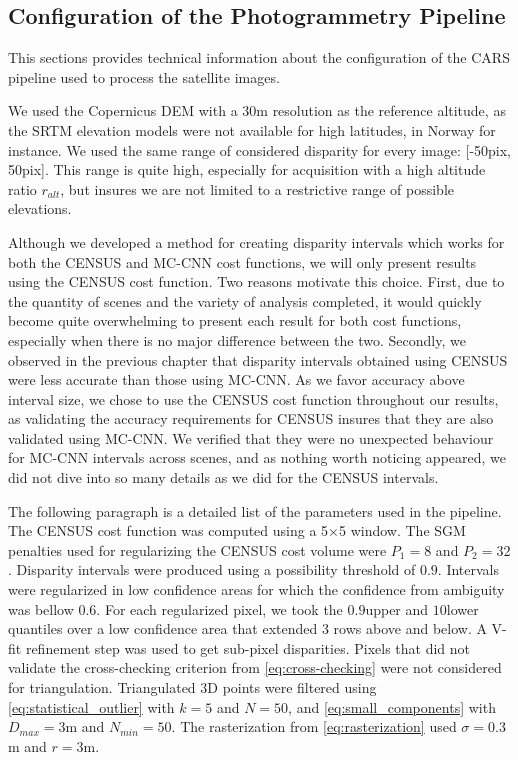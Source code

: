 \subsection{Configuration of the Photogrammetry Pipeline}
This sections provides technical information about the configuration of the CARS pipeline used to process the satellite images.

We used the Copernicus DEM with a 30m resolution as the reference altitude, as the SRTM elevation models were not available for high latitudes, in Norway for instance. We used the same range of considered disparity for every image: [-50pix, 50pix]. This range is quite high, especially for acquisition with a high altitude ratio $r_{alt}$, but insures we are not limited to a restrictive range of possible elevations.

Although we developed a method for creating disparity intervals which works for both the CENSUS and MC-CNN cost functions, we will only present results using the CENSUS cost function. Two reasons motivate this choice. First, due to the quantity of scenes and the variety of analysis completed, it would quickly become quite overwhelming to present each result for both cost functions, especially when there is no major difference between the two. Secondly, we observed in the previous chapter that disparity intervals obtained using CENSUS were less accurate than those using MC-CNN. As we favor accuracy above interval size, we chose to use the CENSUS cost function throughout our results, as validating the accuracy requirements for CENSUS insures that they are also validated using MC-CNN. We verified that they were no unexpected behaviour for MC-CNN intervals across scenes, and as nothing worth noticing appeared, we did not dive into so many details as we did for the CENSUS intervals.  

The following paragraph is a detailed list of the parameters used in the pipeline. The CENSUS cost function was computed using a 5$\times$5 window. The SGM penalties used for regularizing the CENSUS cost volume were $P_1=8$ and $P_2=32$. Disparity intervals were produced using a possibility threshold of $0.9$. Intervals were regularized in low confidence areas for which the confidence from ambiguity was bellow $0.6$. For each regularized pixel, we took the $0.9$\ith upper and $10$\ith lower quantiles over a low confidence area that extended 3 rows above and below. A V-fit refinement step was used to get sub-pixel disparities. Pixels that did not validate the cross-checking criterion from \cref{eq:cross-checking} were not considered for triangulation. Triangulated 3D points were filtered using \cref{eq:statistical_outlier} with $k=5$ and $N=50$, and \cref{eq:small_components} with $D_{max}=3$m and $N_{min}=50$. The rasterization from \cref{eq:rasterization} used $\sigma=0.3$m and $r=3$m.

